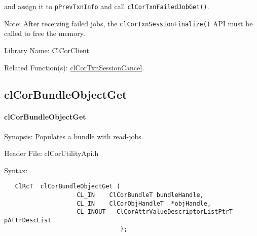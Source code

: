\begin{flushleft}
\begin{Desc}
\begin{enumerate}
 and assign it to {\tt{pPrevTxnInfo}} and call {\tt{clCorTxnFailedJobGet()}}.
\end{enumerate}
\end{Desc}
\begin{Desc}
\item[Note:]
After receiving failed jobs, the {\tt{clCorTxnSessionFinalize()}} API must be called to free the memory.  
\end{Desc}
\begin{Desc}
\item[Library Name:]Cl\-Cor\-Client\end{Desc}
\begin{Desc}
\item[Related Function(s):]\hyperlink{pagecor141}{clCorTxnSessionCancel}. \end{Desc}
\newpage


\subsection{clCorBundleObjectGet}
\hypertarget{pagecor150}{}\paragraph{cl\-Cor\-Bundle\-Object\-Get}\label{pagecor150}
\begin{Desc}
\item[Synopsis:] Populates a bundle with read-jobs.
\end{Desc}
\begin{Desc}
\item[Header File:]clCorUtilityApi.h\end{Desc}
\begin{Desc}
\item[Syntax:]

\footnotesize\begin{verbatim}   ClRcT  clCorBundleObjectGet ( 
					CL_IN    ClCorBundleT bundleHandle,
					CL_IN    ClCorObjHandleT  *objHandle,
					CL_INOUT   ClCorAttrValueDescriptorListPtrT          pAttrDescList
							    );


\end{verbatim}
\end{Desc}
\end{flushleft}
